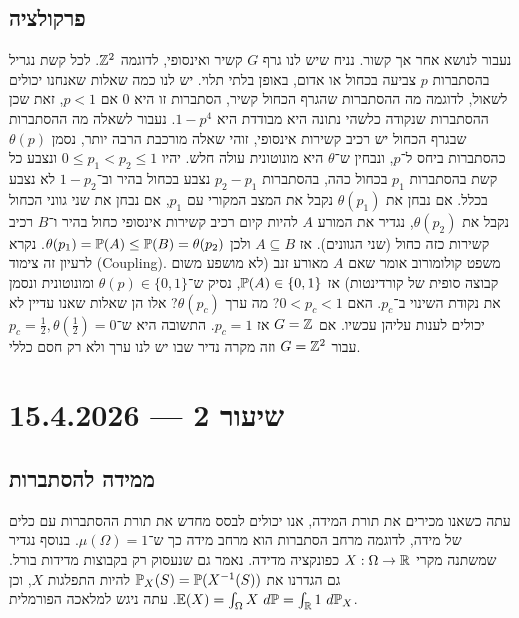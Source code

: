 \subsection{פרקולציה}
נעבור לנושא אחר אך קשור.
נניח שיש לנו גרף $G$ קשיר ואינסופי, לדוגמה $\mathbb{Z}^2$.
לכל קשת נגריל בהסתברות $p$ צביעה בכחול או אדום, באופן בלתי תלוי.
יש לנו כמה שאלות שאנחנו יכולים לשאול, לדוגמה מה ההסתברות שהגרף הכחול קשיר, הסתברות זו היא $0$ אם $p < 1$, זאת שכן ההסתברות שנקודה כלשהי נתונה היא מבודדת היא $1 - p^4$.
נעבור לשאלה מה ההסתברות שבגרף הכחול יש רכיב קשירות אינסופי, זוהי שאלה מורכבת הרבה יותר, נסמן $\theta(p)$ כהסתברות ביחס ל־$p$, ונבחין ש־$\theta$ היא מונוטונית עולה חלש.
יהיו $0 \le p_1 < p_2 \le 1$ ונצבע כל קשת בהסתברות $p_1$ בכחול כהה, בהסתברות $p_2 - p_1$ נצבע בכחול בהיר וב־$1 - p_2$ לא נצבע בכלל.
אם נבחן את $\theta(p_1)$ נקבל את המצב המקורי עם $p_1$, אם נבחן את שני גווני הכחול נקבל את $\theta(p_2)$, נגדיר את המורע $A$ להיות קיום רכיב קשירות אינסופי כחול בהיר ו־$B$ רכיב קשירות כזה כחול (שני הגוונים).
אז $A \subseteq B$ ולכן $\theta(p_1) = \mathbb{P}(A) \le \mathbb{P}(B) = \theta(p_2)$.
נקרא לרעיון זה צימוד (Coupling).
משפט קולומורוב אומר שאם $A$ מאורע זנב (לא מושפע משום קבוצה סופית של קורדינטות) אז $\mathbb{P}(A) \in \{0, 1\}$, נסיק ש־$\theta(p) \in \{0, 1\}$ ומונוטונית ונסמן את נקודת השינוי ב־$p_c$.
האם $0 < p_c < 1$? מה ערך $\theta(p_c)$? אלו הן שאלות שאנו עדיין לא יכולים לענות עליהן עכשיו.
אם $G = \mathbb{Z}$ אז $p_c = 1$.
התשובה היא ש־$p_c = \frac{1}{2}, \theta(\frac{1}{2}) = 0$ עבור $G = \mathbb{Z}^2$ וזה מקרה נדיר שבו יש לנו ערך ולא רק חסם כללי.

\section{שיעור 2 --- 15.4.2026}
\subsection{ממידה להסתברות}
עתה כשאנו מכירים את תורת המידה, אנו יכולים לבסס מחדש את תורת ההסתברות עם כלים של מידה, לדוגמה מרחב הסתברות הוא מרחב מידה כך ש־$\mu(\Omega) = 1$.
בנוסף נגדיר שמשתנה מקרי $X : \Omega \to \mathbb{R}$ כפונקציה מדידה.
נאמר גם שנעסוק רק בקבוצות מדידות בורל.
גם הגדרנו את $\mathbb{P}_X(S) = \mathbb{P}(X^{-1}(S))$ להיות התפלגות $X$, וכן $\mathbb{E}(X) = \int_{\Omega} X\ d\mathbb{P} = \int_{\mathbb{R}} 1\ d \mathbb{P}_X$.
עתה ניגש למלאכה הפורמלית.

